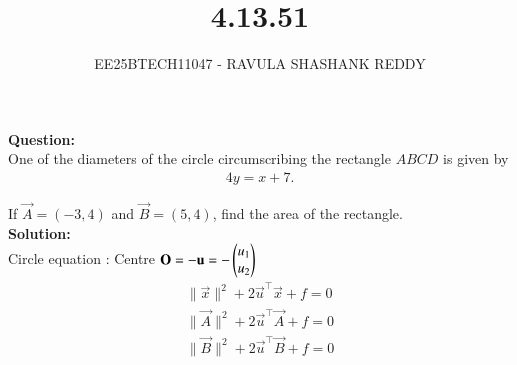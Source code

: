 \documentclass[journal]{article}
\begin{document}
	
	
	\vspace{3cm}
	
\title{4.13.51}
\author{EE25BTECH11047 - RAVULA SHASHANK REDDY}
\maketitle
\hrulefill
\bigskip 

\renewcommand{\thetable}{\theenumi}
\setlength{\intextsep}{10pt}

\textbf{Question:} \\

One of the diameters of the circle circumscribing the rectangle \(ABCD\) is given by
\begin{align*}
4y = x + 7.
\end{align*}

If \(\vec{A}=(-3,4)\) and \(\vec{B}=(5,4)\), find the area of the rectangle.\\

\textbf{Solution:}\\

Circle equation : \quad Centre $\mathbf{O}=-\mathbf{u}=-\begin{pmatrix}u_1\\u_2\end{pmatrix}$
\begin{align}
\|\vec{x}\|^2 + 2 \vec{u}^\top \vec{x} + f = 0\\
\|\vec{A}\|^2 + 2 \vec{u}^\top \vec{A} + f = 0\\
\|\vec{B}\|^2 + 2 \vec{u}^\top \vec{B} + f = 0
\end{align}
\end{document}
